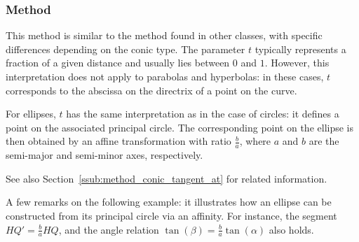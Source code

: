 

\subsubsection{Method } %
\label{ssub:method_conic_point}

This method is similar to the  method found in other classes, with specific differences depending on the conic type.
The parameter \( t \) typically represents a fraction of a given distance and usually lies between \( 0 \) and \( 1 \). However, this interpretation does not apply to parabolas and hyperbolas: in these cases, \( t \) corresponds to the abscissa on the directrix of a point on the curve.

For ellipses, \( t \) has the same interpretation as in the case of circles: it defines a point on the associated principal circle.
The corresponding point on the ellipse is then obtained by an affine transformation with ratio \( \frac{b}{a} \), where \( a \) and \( b \) are the semi-major and semi-minor axes, respectively.

See also Section~\ref{ssub:method_conic_tangent_at} for related information.

A few remarks on the following example: it illustrates how an ellipse can be constructed from its principal circle via an affinity.
For instance, the segment \( HQ' = \frac{b}{a} HQ \), and the angle relation \( \tan(\beta) = \frac{b}{a} \tan(\alpha) \) also holds.

\vspace{1em}

